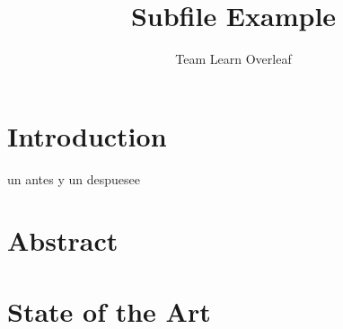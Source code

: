 \documentclass{article}
\title{Subfile Example}
\author{Team Learn Overleaf}
\date{ }
\begin{document}
\maketitle

\section{Introduction}

un antes y un despuesee

\section{Abstract}

\section{State of the Art}

\end{document}
